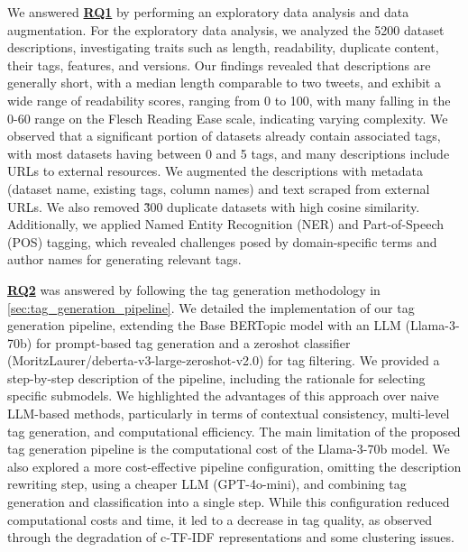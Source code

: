We answered \hyperref[rq1]{\textbf{RQ1}} by performing an exploratory data analysis and data augmentation. For the exploratory data analysis, we analyzed the 5200 dataset descriptions, investigating traits such as length, readability, duplicate content, their tags, features, and versions. Our findings revealed that descriptions are generally short, with a median length comparable to two tweets, and exhibit a wide range of readability scores, ranging from 0 to 100, with many falling in the 0-60 range on the Flesch Reading Ease scale, indicating varying complexity. We observed that a significant portion of datasets already contain associated tags, with most datasets having between 0 and 5 tags, and many descriptions include URLs to external resources. We augmented the descriptions with metadata (dataset name, existing tags, column names) and text scraped from external URLs. We also removed \~300 duplicate datasets with high cosine similarity. Additionally, we applied Named Entity Recognition (NER) and Part-of-Speech (POS) tagging, which revealed challenges posed by domain-specific terms and author names for generating relevant tags.

\hyperref[rq2]{\textbf{RQ2}} was answered by following the tag generation methodology in \cref{sec:tag_generation_pipeline}. We detailed the implementation of our tag generation pipeline, extending the Base BERTopic model with an LLM (Llama-3-70b) for prompt-based tag generation and a zeroshot classifier (MoritzLaurer/deberta-v3-large-zeroshot-v2.0) for tag filtering. We provided a step-by-step description of the pipeline, including the rationale for selecting specific submodels. We highlighted the advantages of this approach over naive LLM-based methods, particularly in terms of contextual consistency, multi-level tag generation, and computational efficiency. The main limitation of the proposed tag generation pipeline is the computational cost of the Llama-3-70b model. We also explored a more cost-effective pipeline configuration, omitting the description rewriting step, using a cheaper LLM (GPT-4o-mini), and combining tag generation and classification into a single step. While this configuration reduced computational costs and time, it led to a decrease in tag quality, as observed through the degradation of c-TF-IDF representations and some clustering issues.

